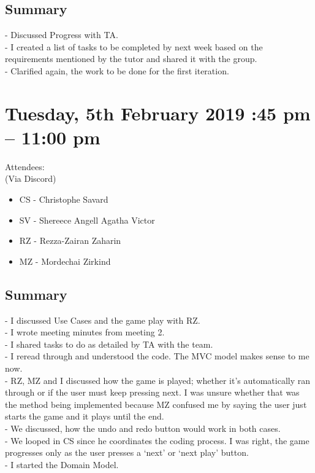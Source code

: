 \documentclass[12pt]{article}
\begin{document}
\subsection{Summary}
-	Discussed Progress with TA.\\
-	I created a list of tasks to be completed by next week based on the requirements mentioned by the tutor and shared it with the group.\\
-	Clarified again, the work to be done for the first iteration.\\ 


\section{Tuesday, 5th February 2019 :45 pm – 11:00 pm }

Attendees:\\ 
(Via Discord) \\
\begin{itemize}
	\item CS - Christophe Savard
	\item SV - Shereece Angell Agatha Victor
	\item RZ - Rezza-Zairan Zaharin
	\item MZ - Mordechai Zirkind
\end{itemize}


\subsection{Summary}
-	I discussed Use Cases and the game play with RZ.\\ 
-	I wrote meeting minutes from meeting 2. \\
-	I shared tasks to do as detailed by TA with the team. \\
-	I reread through and understood the code. The MVC model makes sense to me now. \\
-	RZ, MZ and I discussed how the game is played; whether it’s automatically ran through or if the user must keep pressing next. I was unsure whether that was the method being implemented because MZ confused me by saying the user just starts the game and it plays until the end. \\
-	We discussed, how the undo and redo button would work in both cases.  \\
-	We looped in CS since he coordinates the coding process. I was right, the game progresses only as the user presses a ‘next’ or ‘next play’ button. \\
-	I started the Domain Model. \\
\end{document}
